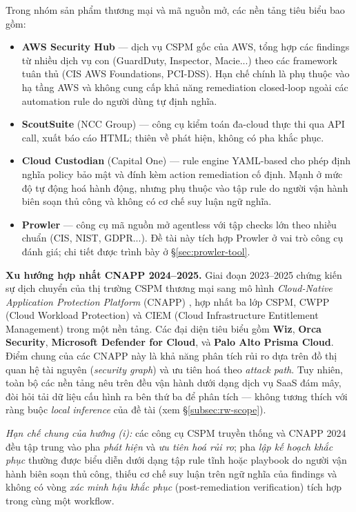 Trong nhóm sản phẩm thương mại và mã nguồn mở, các nền tảng tiêu biểu bao gồm:
\begin{itemize}
    \item \textbf{AWS Security Hub} \cite{aws_securityhub} — dịch vụ CSPM gốc của AWS, tổng hợp các findings từ nhiều dịch vụ con (GuardDuty, Inspector, Macie...) theo các framework tuân thủ (CIS AWS Foundations, PCI-DSS). Hạn chế chính là phụ thuộc vào hạ tầng AWS và không cung cấp khả năng remediation closed-loop ngoài các automation rule do người dùng tự định nghĩa.
    \item \textbf{ScoutSuite} (NCC Group) \cite{scoutsuite} — công cụ kiểm toán đa-cloud thực thi qua API call, xuất báo cáo HTML; thiên về phát hiện, không có pha khắc phục.
    \item \textbf{Cloud Custodian} (Capital One) \cite{cloudcustodian} — rule engine YAML-based cho phép định nghĩa policy bảo mật và đính kèm action remediation cố định. Mạnh ở mức độ tự động hoá hành động, nhưng phụ thuộc vào tập rule do người vận hành biên soạn thủ công và không có cơ chế suy luận ngữ nghĩa.
    \item \textbf{Prowler} \cite{prowler} — công cụ mã nguồn mở agentless với tập checks lớn theo nhiều chuẩn (CIS, NIST, GDPR...). Đề tài này tích hợp Prowler ở vai trò công cụ đánh giá; chi tiết được trình bày ở §\ref{sec:prowler-tool}.
\end{itemize}

\noindent\textbf{Xu hướng hợp nhất CNAPP 2024--2025.} Giai đoạn 2023--2025 chứng kiến sự dịch chuyển của thị trường CSPM thương mại sang mô hình \textit{Cloud-Native Application Protection Platform} (CNAPP) \cite{gartner_cnapp_2024}, hợp nhất ba lớp CSPM, CWPP (Cloud Workload Protection) và CIEM (Cloud Infrastructure Entitlement Management) trong một nền tảng. Các đại diện tiêu biểu gồm \textbf{Wiz}, \textbf{Orca Security}, \textbf{Microsoft Defender for Cloud}, và \textbf{Palo Alto Prisma Cloud}. Điểm chung của các CNAPP này là khả năng phân tích rủi ro dựa trên đồ thị quan hệ tài nguyên (\textit{security graph}) và ưu tiên hoá theo \textit{attack path}. Tuy nhiên, toàn bộ các nền tảng nêu trên đều vận hành dưới dạng dịch vụ SaaS đám mây, đòi hỏi tải dữ liệu cấu hình ra bên thứ ba để phân tích --- không tương thích với ràng buộc \textit{local inference} của đề tài (xem §\ref{subsec:rw-scope}).

\noindent\textit{Hạn chế chung của hướng (i):} các công cụ CSPM truyền thống và CNAPP 2024 đều tập trung vào pha \textit{phát hiện} và \textit{ưu tiên hoá rủi ro}; pha \textit{lập kế hoạch khắc phục} thường được biểu diễn dưới dạng tập rule tĩnh hoặc playbook do người vận hành biên soạn thủ công, thiếu cơ chế suy luận trên ngữ nghĩa của findings và không có vòng \textit{xác minh hậu khắc phục} (post-remediation verification) tích hợp trong cùng một workflow.

